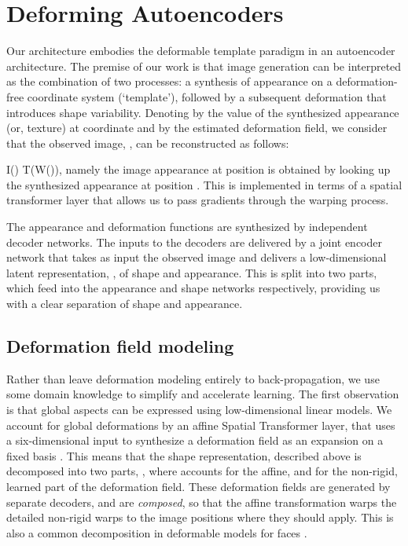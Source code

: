 \documentclass[runningheads]{llncs}
\begin{document}
\section{Deforming Autoencoders}


\newcommand{\obs}{I} \newcommand{\shp}{W}
\newcommand{\temp}{T} \newcommand{\xj}{\mathbf{p}}
\newcommand{\xy}{(x,y)}
\newcommand{\shb}{W} \newcommand{\beq}{}
\newcommand{\ba}{}

Our architecture embodies the deformable template  paradigm in an autoencoder architecture. The  premise of our work is that 
image generation can be interpreted as the combination of two processes: a synthesis of appearance on a deformation-free coordinate system (`template'), followed by a subsequent deformation that introduces shape variability. 
Denoting by  the value of the synthesized appearance (or, texture) at coordinate  and by  the estimated deformation field, we consider that the observed image, , can be reconstructed as follows:
\beq
\obs(\xj) \simeq \temp(\shp(\xj)),
\eeq 
namely  the image appearance at position  is obtained by looking up the synthesized appearance at position . This is implemented in terms of a spatial transformer layer \cite{JaderbergSZK15} that allows us to pass gradients through the warping process.

The appearance and deformation functions are synthesized
by independent decoder networks. The inputs to the
decoders are delivered by a joint encoder network that takes
as input the observed image and delivers a low-dimensional
latent representation, , of shape and appearance. This is
split into two parts,  which feed into the appearance and shape networks respectively, providing us with a clear separation of shape and appearance.

\subsection{Deformation field modeling}
Rather than leave deformation modeling entirely to back-propagation, we use some domain knowledge to simplify and accelerate learning. The first  observation is that global aspects can be expressed using low-dimensional linear models. We account for global deformations by an affine Spatial Transformer layer, that uses a six-dimensional input to synthesize a deformation field as an expansion on a fixed basis \cite{JaderbergSZK15}.
This means that the shape representation,  described above is decomposed into two parts, , where  accounts for the affine, and  for the non-rigid, learned part of the deformation field. 
These deformation fields are generated by separate decoders, and are {\em composed}, so that the affine transformation warps the detailed non-rigid warps to the image positions where they should apply. This is also a common decomposition in deformable models for faces \cite{cootes1998active,MaBa04}. 
\end{document}
